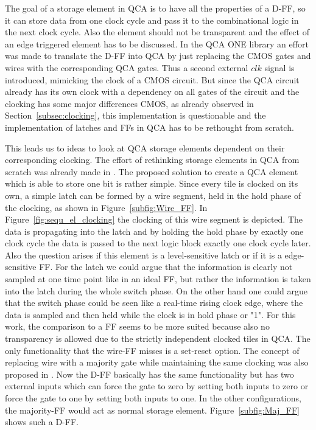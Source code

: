 The goal of a storage element in QCA is to have all the properties of a D-FF, so it can store data from one clock cycle and pass it to the combinational logic in the next clock cycle. Also the element should not be transparent and the effect of an edge triggered element has to be discussed. In the QCA ONE library an effort was made to translate the D-FF into QCA by just replacing the CMOS gates and wires with the corresponding QCA gates. Thus a second external $clk$ signal is introduced, mimicking the clock of a CMOS circuit. But since the QCA circuit already has its own clock with a dependency on all gates of the circuit and the clocking has some major differences CMOS, as already observed in Section~\ref{subsec:clocking}, this implementation is questionable and the implementation of latches and FFs in QCA has to be rethought from scratch.

This leads us to ideas to look at QCA storage elements dependent on their corresponding clocking.
The effort of rethinking storage elements in QCA from scratch was already made in \cite{torres2018synchronization}. The proposed solution to create a QCA element which is able to store one bit is rather simple. Since every tile is clocked on its own, a simple latch can be formed by a wire segment, held in the hold phase of the clocking, as shown in Figure~\ref{subfig:Wire_FF}. In Figure~\ref{fig:sequ_el_clocking} the clocking of this wire segment is depicted. The data is propagating into the latch and by holding the hold phase by exactly one clock cycle the data is passed to the next logic block exactly one clock cycle later. Also the question arises if this element is a level-sensitive latch or if it is a edge-sensitive FF. For the latch we could argue that the information is clearly not sampled at one time point like in an ideal FF, but rather the information is taken into the latch during the whole switch phase. On the other hand one could argue that the switch phase could be seen like a real-time rising clock edge, where the data is sampled and then held while the clock is in hold phase or "1". For this work, the comparison to a FF seems to be more suited because also no transparency is allowed due to the strictly independent clocked tiles in QCA. The only functionality that the wire-FF misses is a set-reset option. The concept of replacing wire with a majority gate while maintaining the same clocking was also proposed in \cite{Walter}. Now the D-FF basically has the same functionality but has two external inputs which can force the gate to zero by setting both inputs to zero or force the gate to one by setting both inputs to one. In the other configurations, the majority-FF would act as normal storage element. Figure~\ref{subfig:Maj_FF} shows such a D-FF.

